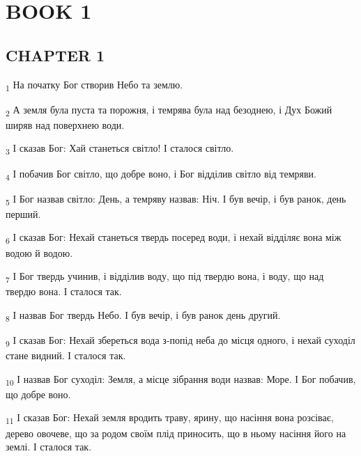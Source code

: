 \section{BOOK 1}
\subsection{CHAPTER 1}
\begin{tcolorbox}
\textsubscript{1} На початку Бог створив Небо та землю.
\end{tcolorbox}
\begin{tcolorbox}
\textsubscript{2} А земля була пуста та порожня, і темрява була над безоднею, і Дух Божий ширяв над поверхнею води.
\end{tcolorbox}
\begin{tcolorbox}
\textsubscript{3} І сказав Бог: Хай станеться світло! І сталося світло.
\end{tcolorbox}
\begin{tcolorbox}
\textsubscript{4} І побачив Бог світло, що добре воно, і Бог відділив світло від темряви.
\end{tcolorbox}
\begin{tcolorbox}
\textsubscript{5} І Бог назвав світло: День, а темряву назвав: Ніч. І був вечір, і був ранок, день перший.
\end{tcolorbox}
\begin{tcolorbox}
\textsubscript{6} І сказав Бог: Нехай станеться твердь посеред води, і нехай відділяє вона між водою й водою.
\end{tcolorbox}
\begin{tcolorbox}
\textsubscript{7} І Бог твердь учинив, і відділив воду, що під твердю вона, і воду, що над твердю вона. І сталося так.
\end{tcolorbox}
\begin{tcolorbox}
\textsubscript{8} І назвав Бог твердь Небо. І був вечір, і був ранок день другий.
\end{tcolorbox}
\begin{tcolorbox}
\textsubscript{9} І сказав Бог: Нехай збереться вода з-попід неба до місця одного, і нехай суходіл стане видний. І сталося так.
\end{tcolorbox}
\begin{tcolorbox}
\textsubscript{10} І назвав Бог суходіл: Земля, а місце зібрання води назвав: Море. І Бог побачив, що добре воно.
\end{tcolorbox}
\begin{tcolorbox}
\textsubscript{11} І сказав Бог: Нехай земля вродить траву, ярину, що насіння вона розсіває, дерево овочеве, що за родом своїм плід приносить, що в ньому насіння його на землі. І сталося так.
\end{tcolorbox}

